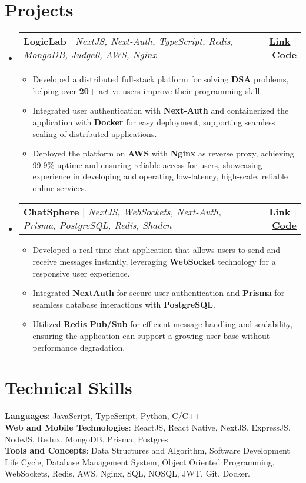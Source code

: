 \documentclass[letterpaper,11pt]{article}
\makeatletter
\newcommand{\resumeItem}[1]{
  \item\small{
    {#1 \vspace{-2pt}}
  }
}
\newcommand{\resumeProjectHeading}[2]{
    \item
    \begin{tabular*}{1.001\textwidth}{l@{\extracolsep{\fill}}r}
      \small#1 & \textbf{\small #2}\\
    \end{tabular*}\vspace{-7pt}
}
\newcommand{\resumeSubHeadingListStart}{\begin{itemize}[leftmargin=0.0in, label={}]}
\newcommand{\resumeSubHeadingListEnd}{\end{itemize}}
\newcommand{\resumeItemListStart}{\begin{itemize}}
\newcommand{\resumeItemListEnd}{\end{itemize}\vspace{-5pt}}
\makeatother
\begin{document}
\section{Projects}
    \vspace{-5pt}
    \resumeSubHeadingListStart
      \resumeProjectHeading
          {\textbf{LogicLab} $|$ \emph{NextJS, Next-Auth, TypeScript, Redis, MongoDB, Judge0, AWS, Nginx}}{ \href{https://logiclab.amanmeenia.com}{Link} $|$ \href{https://github.com/Aman-Meenia/logiclab}{Code} }
          \resumeItemListStart
            \resumeItem{Developed a distributed full-stack platform for solving \textbf{DSA} problems, helping over \textbf{20+} active users improve their programming skill.}
            \resumeItem{Integrated user authentication with \textbf{Next-Auth} and containerized the application with \textbf{Docker} for easy deployment, supporting seamless scaling of distributed applications.}
            \resumeItem{Deployed the platform on \textbf{AWS} with \textbf{Nginx} as reverse proxy, achieving 99.9\% uptime and ensuring reliable access for users, showcasing experience in developing and operating low-latency, high-scale, reliable online services.}
          \resumeItemListEnd
          \vspace{-13pt}
          \resumeProjectHeading
          {\textbf{ChatSphere} $|$ \emph{NextJS, WebSockets, Next-Auth, Prisma, PostgreSQL, Redis, Shadcn}}{ \href{https://aman-meenia.work.gd/login}{Link} $|$ \href{https://github.com/Aman-Meenia/chatsphere}{Code} }
          \resumeItemListStart
            \resumeItem{Developed a real-time chat application that allows users to send and receive messages instantly, leveraging \textbf{WebSocket} technology for a responsive user experience.}
            \resumeItem{Integrated \textbf{NextAuth} for secure user authentication and \textbf{Prisma} for seamless database interactions with \textbf{PostgreSQL}.}
            \resumeItem{Utilized \textbf{ Redis Pub/Sub} for efficient message handling and scalability, ensuring the application can support a growing user base without performance degradation.}
          \resumeItemListEnd 
    \resumeSubHeadingListEnd
\vspace{-15pt}


%
\section{Technical Skills}
 \begin{itemize}[leftmargin=0.15in, label={}]
    \small{\item{
     \textbf{Languages}{: JavaScript, TypeScript, Python, C/C++} \\
     \textbf{Web and Mobile Technologies}{: ReactJS, React Native, NextJS, ExpressJS, NodeJS, Redux, MongoDB, Prisma, Postgres} \\
     \textbf{Tools and Concepts}{: Data Structures and Algorithm, Software Development Life Cycle, Database Management System, Object Oriented Programming, WebSockets, Redis, AWS, Nginx, SQL, NOSQL, JWT, Git, Docker.} \\
    }}
 \end{itemize}
 \vspace{-16pt}
\end{document}
